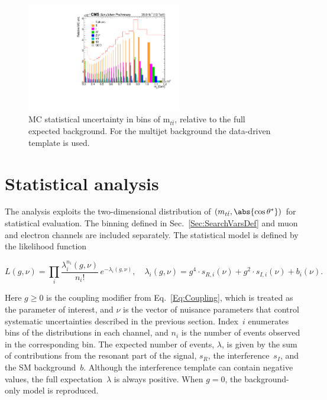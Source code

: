 \begin{figure}
  \centering
  \includegraphics[width=0.6\textwidth]{fig/chapt7/syst/statMC.pdf}
  \caption{MC statistical uncertainty in bins of m$_{t\bar t}$, relative to the full expected background. For the multijet background the data-driven template is used.}
  \label{Fig:SystMCStat}
\end{figure}

\section{Statistical analysis}
\label{Sec:StatAnalysis}
%
The analysis exploits the two-dimensional distribution of $(m_{t\bar t}, \abs{\cos\theta^*})$ for statistical evaluation. The binning defined in Sec.~\ref{Sec:SearchVarsDef} and muon and electron channels are included separately.
The statistical model is defined by the likelihood function
\begin{linenomath}
\begin{equation}
 L(g, \nu) = \prod_i \frac{\lambda_i^{n_i}(g, \nu)}{n_i!}\, e^{-\lambda_i(g, \nu)},\quad \lambda_i(g, \nu) = g^4 \cdot s_{R,i}(\nu) + g^2 \cdot s_{I,i}(\nu) + b_i(\nu).
 \label{Eq:Likelihood}
\end{equation}
\end{linenomath}
Here $g \geqslant 0$ is the coupling modifier from Eq.~\ref{Eq:Coupling}, which is treated as the parameter of interest, and $\nu$ is the vector of nuisance parameters that control systematic uncertainties described in the previous section.
Index~$i$ enumerates bins of the distributions in each channel, and $n_i$ is the number of events observed in the corresponding bin.
The expected number of events, $\lambda$, is given by the sum of contributions from the resonant part of the signal, $s_R$, the interference~$s_I$, and the SM background~$b$.
Although the interference template can contain negative values, the full expectation~$\lambda$ is always positive.
When $g = 0$, the background-only model is reproduced.

